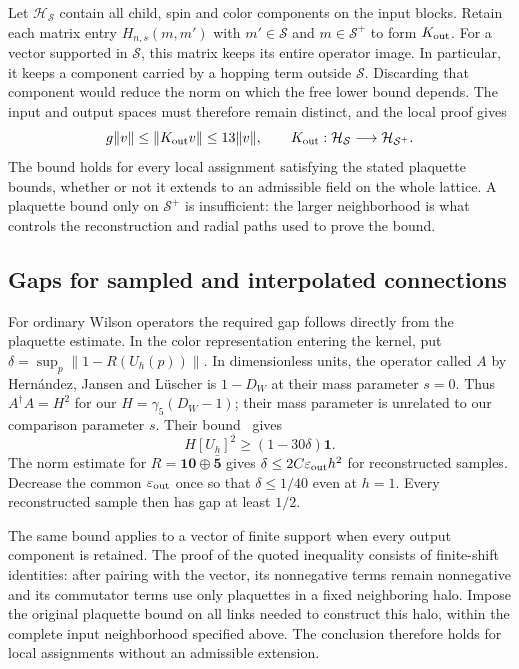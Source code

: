 \documentclass[11pt,a4paper]{article}
\theoremstyle{remark}
\newcommand{\Id}{\mathbf 1}
\newcommand{\eps}{\varepsilon}
\begin{document}
Let $\mathcal H_{\mathcal S}$ contain all child, spin and color
components on the input blocks. Retain each matrix entry
$H_{n,s}(m,m')$ with $m'\in\mathcal S$ and
$m\in\mathcal S^+$ to form $K_{\rm out}$. For a vector supported
in $\mathcal S$, this matrix keeps its entire operator image. In
particular, it keeps a component carried by a hopping term outside
$\mathcal S$. Discarding that component would reduce the norm on
which the free lower bound depends. The input and output spaces must
therefore remain distinct, and the local proof gives
\begin{equation}
 g\|v\|\le\|K_{\rm out}v\|\le13\|v\|,
 \qquad
 K_{\rm out}:\mathcal H_{\mathcal S}
                    \longrightarrow\mathcal H_{\mathcal S^+}.
\end{equation}
The bound holds for every local assignment satisfying the stated plaquette
bounds, whether or not it extends to an admissible field on the whole
lattice. A plaquette bound only on
$\mathcal S^+$ is insufficient: the larger neighborhood is what
controls the reconstruction and radial paths used to prove the bound.

\subsection{Gaps for sampled and interpolated connections}
\label{app:s:ordinary-cylinder}
\label{app:s:local-family}

For ordinary Wilson operators the required gap follows directly from
the plaquette estimate. In the color representation entering the
kernel, put $\delta=\sup_p\|1-R(U_h(p))\|$.
In dimensionless units, the operator called $A$ by
Hern\'andez, Jansen and L\"uscher is $1-D_W$ at their mass parameter
$s=0$. Thus $A^\dagger A=H^2$ for our $H=\gamma_5(D_W-1)$;
their mass parameter is unrelated to our comparison parameter $s$.
Their bound~\cite[eq.~(2.16), appendix~C]{HJL} gives
\begin{equation}
 H[U_h]^2\ge(1-30\delta)\Id .
\end{equation}
The norm estimate for $R=\mathbf{10}\oplus\bar{\mathbf5}$ gives
$\delta\le2C\eps_{\rm out}h^2$ for reconstructed samples.
Decrease the common $\eps_{\rm out}$ once so that $\delta\le1/40$
even at $h=1$. Every reconstructed sample then has gap at least $1/2$.

The same bound applies to a vector of finite support when every output
component is retained. The proof of the quoted inequality consists of
finite-shift identities: after pairing with the vector, its nonnegative
terms remain nonnegative and its commutator terms use only plaquettes
in a fixed neighboring halo. Impose the original plaquette bound on
all links needed to construct this halo, within the complete input
neighborhood specified above. The conclusion therefore holds for
local assignments without an admissible extension.
\end{document}
